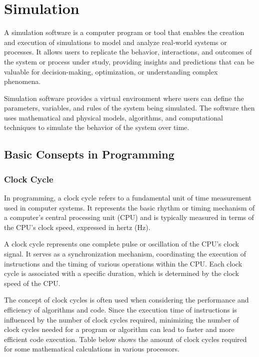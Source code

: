 \documentclass[a4paper,oneside,12pt]{report}
\numberwithin{equation}{chapter}
\begin{document}
\section{Simulation}


A simulation software is a computer program or tool that enables the creation and execution of 
simulations to model and analyze real-world systems or processes. 
It allows users to replicate the behavior, interactions, and outcomes of the system or process under study, 
providing insights and predictions that can be valuable for decision-making, optimization, or understanding complex phenomena.

Simulation software provides a virtual environment where users can define the parameters,
variables, and rules of the system being simulated. The software then uses mathematical and physical models, 
algorithms, and computational techniques to simulate the behavior of the system over time.

\subsection{Basic Consepts in Programming}

\subsubsection{Clock Cycle}

In programming, a clock cycle refers to a fundamental unit of time measurement used in computer systems. 
It represents the basic rhythm or timing mechanism of a computer's central processing unit (CPU) and is typically measured in terms of the CPU's clock speed, expressed in hertz (Hz).

A clock cycle represents one complete pulse or oscillation of the CPU's clock signal. 
It serves as a synchronization mechanism, coordinating the execution of instructions and the timing of various operations within the CPU.
Each clock cycle is associated with a specific duration, which is determined by the clock speed of the CPU.

The concept of clock cycles is often used when considering the performance and efficiency of algorithms and code. 
Since the execution time of instructions is influenced by the number of clock cycles required, minimizing the number of clock cycles needed for a program or algorithm can lead to faster and more efficient code execution.
Table below shows the amount of clock cycles required for some mathematical calculations in various processors.
\end{document}
